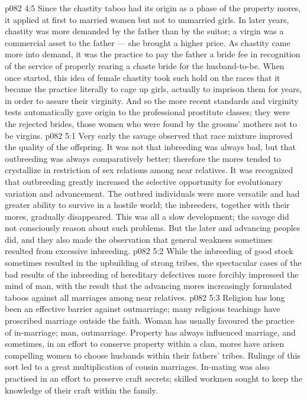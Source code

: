 \vs p082 4:5 Since the chastity taboo had its origin as a phase of the property mores, it applied at first to married women but not to unmarried girls. In later years, chastity was more demanded by the father than by the suitor; a virgin was a commercial asset to the father --- she brought a higher price. As chastity came more into demand, it was the practice to pay the father a bride fee in recognition of the service of properly rearing a chaste bride for the husband\hyp{}to\hyp{}be. When once started, this idea of female chastity took such hold on the races that it became the practice literally to cage up girls, actually to imprison them for years, in order to assure their virginity. And so the more recent standards and virginity tests automatically gave origin to the professional prostitute classes; they were the rejected brides, those women who were found by the grooms’ mothers not to be virgins.
\vs p082 5:1 Very early the savage observed that race mixture improved the quality of the offspring. It was not that inbreeding was always bad, but that outbreeding was always comparatively better; therefore the mores tended to crystallize in restriction of sex relations among near relatives. It was recognized that outbreeding greatly increased the selective opportunity for evolutionary variation and advancement. The outbred individuals were more versatile and had greater ability to survive in a hostile world; the inbreeders, together with their mores, gradually disappeared. This was all a slow development; the savage did not consciously reason about such problems. But the later and advancing peoples did, and they also made the observation that general weakness sometimes resulted from excessive inbreeding.
\vs p082 5:2 While the inbreeding of good stock sometimes resulted in the upbuilding of strong tribes, the spectacular cases of the bad results of the inbreeding of hereditary defectives more forcibly impressed the mind of man, with the result that the advancing mores increasingly formulated taboos against all marriages among near relatives.
\vs p082 5:3 \pc Religion has long been an effective barrier against outmarriage; many religious teachings have proscribed marriage outside the faith. Woman has usually favoured the practice of in\hyp{}marriage; man, outmarriage. Property has always influenced marriage, and sometimes, in an effort to conserve property within a clan, mores have arisen compelling women to choose husbands within their fathers’ tribes. Rulings of this sort led to a great multiplication of cousin marriages. In\hyp{}mating was also practised in an effort to preserve craft secrets; skilled workmen sought to keep the knowledge of their craft within the family.
